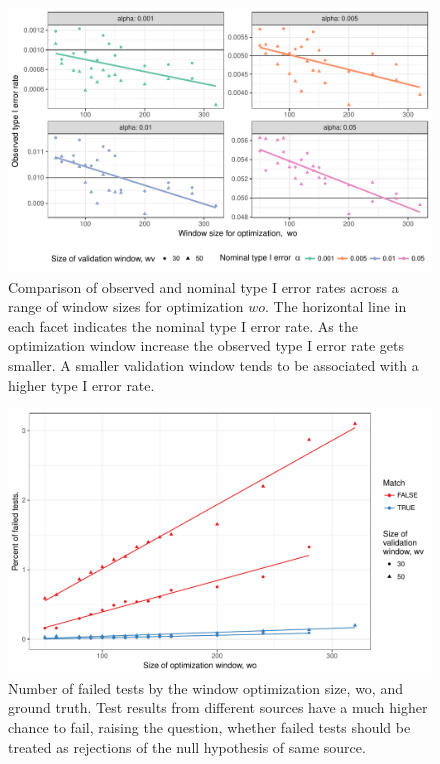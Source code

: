 \documentclass[12pt]{article}
\begin{document}
\begin{figure}

{\centering \includegraphics[width=\textwidth]{figures/type1-1} 

}

\caption{Comparison of observed and nominal type I error rates  across a range of window sizes for optimization $wo$. The horizontal line in each facet indicates the nominal type I error rate.  As the optimization window increase the observed type I error rate gets smaller. A smaller validation window tends to be associated with a higher type I error rate.}\label{fig:type1}
\end{figure}

\begin{figure}

{\centering \includegraphics[width=\textwidth]{figures/missings-1} 

}

\caption{Number of failed tests by the window optimization size, wo, and ground truth. Test results from different sources have a much higher chance to fail, raising the question, whether failed tests should be treated as rejections of the null hypothesis of same source.}\label{fig:missings}
\end{figure}
\end{document}
